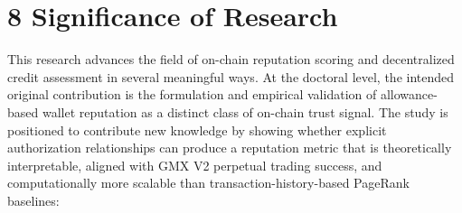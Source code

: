 \clearpage
{}
\section*{8 \textbf{Significance of Research}}
\label{sec:significance-of-research}

This research advances the field of on-chain reputation scoring and decentralized credit assessment in several meaningful ways. At the doctoral level, the intended original contribution is the formulation and empirical validation of allowance-based wallet reputation as a distinct class of on-chain trust signal. The study is positioned to contribute new knowledge by showing whether explicit authorization relationships can produce a reputation metric that is theoretically interpretable, aligned with GMX V2 perpetual trading success, and computationally more scalable than transaction-history-based PageRank baselines:



